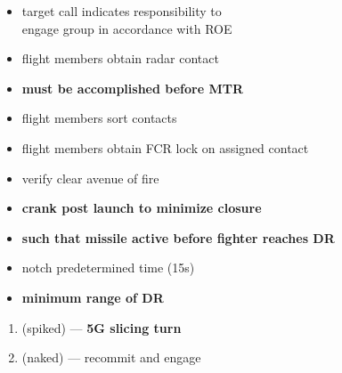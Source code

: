 \begin{checklistenumerate}[start=0]
    \blueitem[Target]
    \label{subsec:ttpaa:timeline:banzai:target}
    \begin{itemize}
        \item target call indicates responsibility to \\
        engage group in accordance with ROE
        \item flight members obtain radar contact
        \item \textbf{must be accomplished before MTR}
    \end{itemize}

    \blueitem[Sort]
    \label{subsec:ttpaa:timeline:banzai:sort}
    \begin{itemize}
        \item flight members sort contacts
        \item flight members obtain FCR lock on assigned contact
    \end{itemize}

    \blueitem[Employment]
    \label{subsec:ttpaa:timeline:banzai:shoot}
    \begin{itemize} 
        \item verify clear avenue of fire
        \item \textbf{crank post launch to minimize closure}
        \item \textbf{such that missile active before fighter reaches DR}
    \end{itemize}
    
    \blueitem[Notch]
    \label{subsec:ttpaa:timeline:banzai:notch}
    \begin{itemize} 
        \item notch predetermined time (15s)
        \item \textbf{minimum range of DR}
    \end{itemize}
    \begin{enumerate}[label=\textbf{\arabic{enumi}\alph*.}]
        \item {} (spiked) --- \textbf{5G slicing turn}%
        \label{subsec:ttpaa:timeline:banzai:abort}%
        \item {} (naked) --- recommit and engage%
        \label{subsec:ttpaa:timeline:banzai:banzai}%
    \end{enumerate}
    
\end{checklistenumerate}

\clearpage

